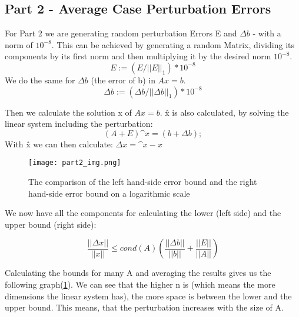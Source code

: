 \documentclass{article}
\begin{document}
\subsection{Part 2 -  Average Case Perturbation Errors}
For Part 2 we are generating random perturbation Errors E and \(\Delta b\) - with a norm of \(10^{-8}\).
This can be achieved by generating a random Matrix, dividing its components by its first norm and then multiplying it by the desired norm \(10^{-8}\).
\begin{equation}
     E := (E / ||E||_1) * 10^{-8}
\end{equation}
We do the same for \(\Delta b\) (the error of b) in \(A x = b\).
\begin{equation}
     \Delta b := (\Delta b / ||\Delta b||_1) * 10^{-8}
\end{equation}
\par\noindent
Then we calculate the solution x of \(A x = b\). \^x is also calculated, by solving the linear system including the perturbation:
\begin{equation}
    (A + E)  \^x =  (b + \Delta b);
\end{equation}
With \^x we can then calculate: \(\Delta x = \^x-x\)
\begin{figure}
    \centering
    \texttt{[image: part2\_img.png]}
    \caption{The comparison of the left hand-side error bound and the right hand-side error bound on a logarithmic scale}
    \label{fig:part2_result}
\end{figure}
We now have all the components for calculating the lower (left side) and the upper bound (right side):

\begin{equation}
    \frac{||\Delta x||}{||x||} \leq cond(A) (\frac{||\Delta b||}{||b||} + \frac{||E||}{||A||})
\end{equation}

\par\noindent
Calculating the bounds for many A and averaging the results gives us the following graph(\ref{fig:part2_result}).
We can see that the higher n is (which means the more dimensions the linear system has), the more space is between the lower and the upper bound.
This means, that the perturbation increases with the size of A.
\end{document}
